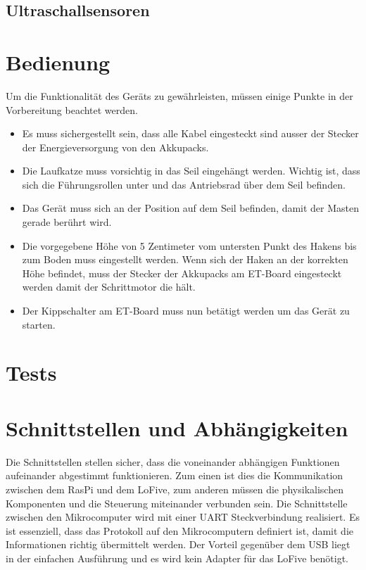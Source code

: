 \documentclass[a4paper]{report}
\begin{document}
\subsection{Ultraschallsensoren}
\label{ssec:UltrasonicSensorInterface}

\section{Bedienung}
\label{sec:Bedienung}
Um die Funktionalität des Geräts zu gewährleisten, müssen einige Punkte in der Vorbereitung beachtet werden.

\begin{itemize}
	\item Es muss sichergestellt sein, dass alle Kabel eingesteckt sind ausser der Stecker der Energieversorgung von den Akkupacks.
	\item Die Laufkatze muss vorsichtig in das Seil eingehängt werden. Wichtig ist, dass sich die Führungsrollen unter und das Antriebsrad über dem Seil befinden.
	\item Das Gerät muss sich an der Position auf dem Seil befinden, damit der Masten gerade berührt wird.
	\item Die vorgegebene Höhe von 5 Zentimeter vom untersten Punkt des Hakens bis zum Boden muss eingestellt werden. Wenn sich der Haken an der korrekten Höhe befindet, muss der Stecker der Akkupacks am ET-Board eingesteckt werden damit der Schrittmotor die hält.
	\item Der Kippschalter am ET-Board muss nun betätigt werden um das Gerät zu starten.
\end{itemize}

\section{Tests}
\label{sec:TestsPrototyp}

\section{Schnittstellen und Abhängigkeiten}
\label{sec:SchnittAbhang}

Die Schnittstellen stellen sicher, dass die voneinander abhängigen Funktionen aufeinander abgestimmt funktionieren. Zum einen ist dies die Kommunikation zwischen dem RasPi und dem LoFive, zum anderen müssen die physikalischen Komponenten und die Steuerung miteinander verbunden sein. Die Schnittstelle zwischen den Mikrocomputer wird mit einer UART Steckverbindung realisiert. Es ist essenziell, dass das Protokoll auf den Mikrocomputern definiert ist, damit die Informationen richtig übermittelt werden. Der Vorteil gegenüber dem USB liegt in der einfachen Ausführung und es wird kein Adapter für das LoFive benötigt.
\end{document}

